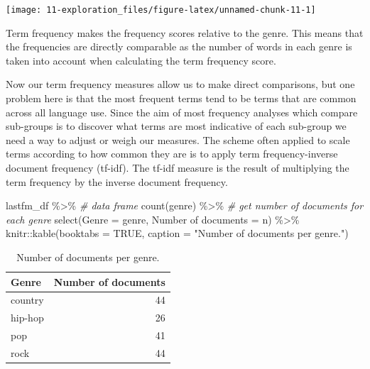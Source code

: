 \documentclass[
]{article}
\newenvironment{Shaded}{\begin{snugshade}}{\end{snugshade}}
\newcommand{\AttributeTok}[1]{\textcolor[rgb]{0.77,0.63,0.00}{#1}}
\newcommand{\CommentTok}[1]{\textcolor[rgb]{0.56,0.35,0.01}{\textit{#1}}}
\newcommand{\ConstantTok}[1]{\textcolor[rgb]{0.00,0.00,0.00}{#1}}
\newcommand{\FunctionTok}[1]{\textcolor[rgb]{0.00,0.00,0.00}{#1}}
\newcommand{\NormalTok}[1]{#1}
\newcommand{\OtherTok}[1]{\textcolor[rgb]{0.56,0.35,0.01}{#1}}
\newcommand{\SpecialCharTok}[1]{\textcolor[rgb]{0.00,0.00,0.00}{#1}}
\newcommand{\StringTok}[1]{\textcolor[rgb]{0.31,0.60,0.02}{#1}}
\begin{document}
\begin{center}\texttt{[image: 11-exploration\_files/figure-latex/unnamed-chunk-11-1]} \end{center}

Term frequency makes the frequency scores relative to the genre. This means that the frequencies are directly comparable as the number of words in each genre is taken into account when calculating the term frequency score.

Now our term frequency measures allow us to make direct comparisons, but one problem here is that the most frequent terms tend to be terms that are common across all language use. Since the aim of most frequency analyses which compare sub-groups is to discover what terms are most indicative of each sub-group we need a way to adjust or weigh our measures. The scheme often applied to scale terms according to how common they are is to apply term frequency-inverse document frequency (tf-idf). The tf-idf measure is the result of multiplying the term frequency by the inverse document frequency.

\begin{Shaded}
\begin{Highlighting}[]
\NormalTok{lastfm\_df }\SpecialCharTok{\%\textgreater{}\%} \CommentTok{\# data frame}
  \FunctionTok{count}\NormalTok{(genre) }\SpecialCharTok{\%\textgreater{}\%}  \CommentTok{\# get number of documents for each genre}
  \FunctionTok{select}\NormalTok{(}\AttributeTok{Genre =}\NormalTok{ genre, }\StringTok{\textasciigrave{}}\AttributeTok{Number of documents}\StringTok{\textasciigrave{}} \OtherTok{=}\NormalTok{ n) }\SpecialCharTok{\%\textgreater{}\%} 
\NormalTok{  knitr}\SpecialCharTok{::}\FunctionTok{kable}\NormalTok{(}\AttributeTok{booktabs =} \ConstantTok{TRUE}\NormalTok{,}
               \AttributeTok{caption =} \StringTok{"Number of documents per genre."}\NormalTok{)}
\end{Highlighting}
\end{Shaded}

\begin{table}

\caption{\label{tab:unnamed-chunk-12}Number of documents per genre.}
\centering
\begin{tabular}[t]{lr}
\toprule
Genre & Number of documents\\
\midrule
country & 44\\
hip-hop & 26\\
pop & 41\\
rock & 44\\
\bottomrule
\end{tabular}
\end{table}
\end{document}

